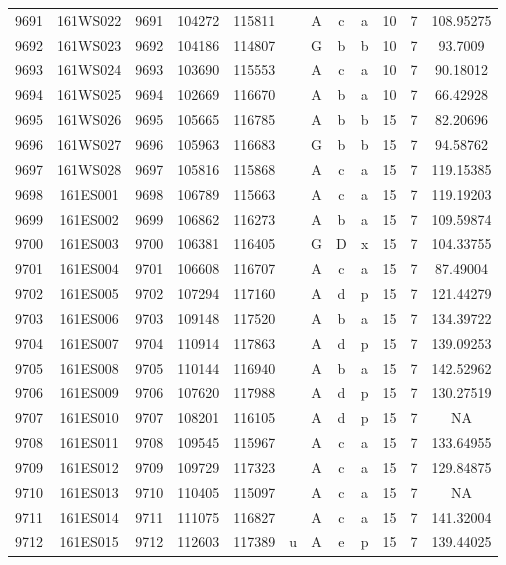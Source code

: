 \begin{tabular}{|*{12}{c|}}
9691 & 161WS022 & 9691 & 104272 & 115811 &  & A & c & a & 10 & 7 & 108.95275 \\ 
9692 & 161WS023 & 9692 & 104186 & 114807 &  & G & b & b & 10 & 7 & 93.7009 \\ 
9693 & 161WS024 & 9693 & 103690 & 115553 &  & A & c & a & 10 & 7 & 90.18012 \\ 
9694 & 161WS025 & 9694 & 102669 & 116670 &  & A & b & a & 10 & 7 & 66.42928 \\ 
9695 & 161WS026 & 9695 & 105665 & 116785 &  & A & b & b & 15 & 7 & 82.20696 \\ 
9696 & 161WS027 & 9696 & 105963 & 116683 &  & G & b & b & 15 & 7 & 94.58762 \\ 
9697 & 161WS028 & 9697 & 105816 & 115868 &  & A & c & a & 15 & 7 & 119.15385 \\ 
9698 & 161ES001 & 9698 & 106789 & 115663 &  & A & c & a & 15 & 7 & 119.19203 \\ 
9699 & 161ES002 & 9699 & 106862 & 116273 &  & A & b & a & 15 & 7 & 109.59874 \\ 
9700 & 161ES003 & 9700 & 106381 & 116405 &  & G & D & x & 15 & 7 & 104.33755 \\ 
9701 & 161ES004 & 9701 & 106608 & 116707 &  & A & c & a & 15 & 7 & 87.49004 \\ 
9702 & 161ES005 & 9702 & 107294 & 117160 &  & A & d & p & 15 & 7 & 121.44279 \\ 
9703 & 161ES006 & 9703 & 109148 & 117520 &  & A & b & a & 15 & 7 & 134.39722 \\ 
9704 & 161ES007 & 9704 & 110914 & 117863 &  & A & d & p & 15 & 7 & 139.09253 \\ 
9705 & 161ES008 & 9705 & 110144 & 116940 &  & A & b & a & 15 & 7 & 142.52962 \\ 
9706 & 161ES009 & 9706 & 107620 & 117988 &  & A & d & p & 15 & 7 & 130.27519 \\ 
9707 & 161ES010 & 9707 & 108201 & 116105 &  & A & d & p & 15 & 7 & NA \\ 
9708 & 161ES011 & 9708 & 109545 & 115967 &  & A & c & a & 15 & 7 & 133.64955 \\ 
9709 & 161ES012 & 9709 & 109729 & 117323 &  & A & c & a & 15 & 7 & 129.84875 \\ 
9710 & 161ES013 & 9710 & 110405 & 115097 &  & A & c & a & 15 & 7 & NA \\ 
9711 & 161ES014 & 9711 & 111075 & 116827 &  & A & c & a & 15 & 7 & 141.32004 \\ 
9712 & 161ES015 & 9712 & 112603 & 117389 & u & A & e & p & 15 & 7 & 139.44025 \\ 

\end{tabular}
